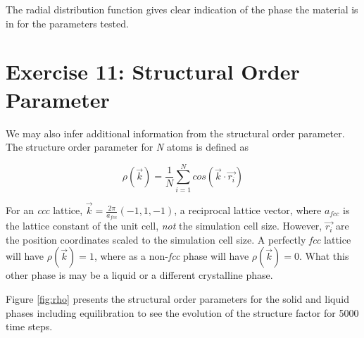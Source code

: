 \documentclass[12pt, oneside]{article}
\begin{document}
The radial distribution function gives clear indication of the phase the material is in for the parameters tested.

\section{Exercise 11: Structural Order Parameter}

We may also infer additional information from the structural order parameter. The structure order parameter for \textit{N} atoms is defined as

\begin{equation}
 	\rho(\vec{k}) = \frac{1}{N}  \sum\limits_{i=1}^N cos(\vec{k}\cdot \vec{r_i})
\end{equation}

For an \textit{ccc} lattice, $\vec{k} = \frac{2\pi}{a_{fcc}}(-1,1,-1)$, a reciprocal lattice vector, where $a_{fcc}$ is the lattice constant of the unit cell, \textit{not} the simulation cell size. However, $\vec{r_i}$ are the position coordinates scaled to the simulation cell size. A perfectly \textit{fcc} lattice will have $\rho(\vec{k}) = 1$, where as a non-\textit{fcc} phase will have $\rho(\vec{k}) = 0$. What this other phase is may be a liquid or a different crystalline phase.

Figure \ref{fig:rho} presents the structural order parameters for the solid and liquid phases including equilibration to see the evolution of the structure factor for 5000 time steps.
\end{document}
